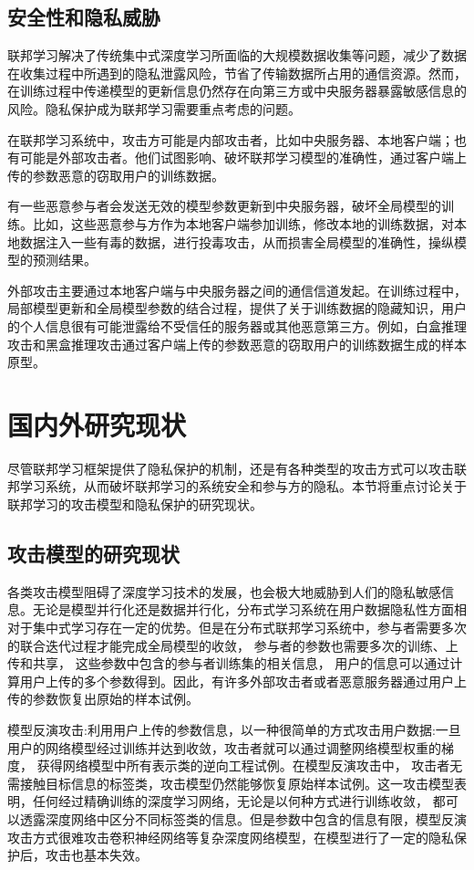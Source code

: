 \subsection{安全性和隐私威胁}
联邦学习解决了传统集中式深度学习所面临的大规模数据收集等问题，减少了数据在收集过程中所遇到的隐私泄露风险，节省了传输数据所占用的通信资源。然而，在训练过程中传递模型的更新信息仍然存在向第三方或中央服务器暴露敏感信息的风险。隐私保护成为联邦学习需要重点考虑的问题。

在联邦学习系统中，攻击方可能是内部攻击者，比如中央服务器、本地客户端；也有可能是外部攻击者。他们试图影响、破坏联邦学习模型的准确性，通过客户端上传的参数恶意的窃取用户的训练数据。

有一些恶意参与者会发送无效的模型参数更新到中央服务器，破坏全局模型的训练。比如，这些恶意参与方作为本地客户端参加训练，修改本地的训练数据，对本地数据注入一些有毒的数据，进行投毒攻击，从而损害全局模型的准确性，操纵模型的预测结果。

外部攻击主要通过本地客户端与中央服务器之间的通信信道发起。在训练过程中，局部模型更新和全局模型参数的结合过程，提供了关于训练数据的隐藏知识，用户的个人信息很有可能泄露给不受信任的服务器或其他恶意第三方。例如，白盒推理攻击和黑盒推理攻击通过客户端上传的参数恶意的窃取用户的训练数据生成的样本原型。

\section{国内外研究现状}
尽管联邦学习框架提供了隐私保护的机制，还是有各种类型的攻击方式可以攻击联邦学习系统，从而破坏联邦学习的系统安全和参与方的隐私。本节将重点讨论关于联邦学习的攻击模型和隐私保护的研究现状。

\subsection{攻击模型的研究现状}
各类攻击模型阻碍了深度学习技术的发展，也会极大地威胁到人们的隐私敏感信息。无论是模型并行化还是数据并行化，分布式学习系统在用户数据隐私性方面相对于集中式学习存在一定的优势。但是在分布式联邦学习系统中，参与者需要多次的联合迭代过程才能完成全局模型的收敛， 参与者的参数也需要多次的训练、上传和共享， 这些参数中包含的参与者训练集的相关信息， 用户的信息可以通过计算用户上传的多个参数得到。因此，有许多外部攻击者或者恶意服务器通过用户上传的参数恢复出原始的样本试例。

模型反演攻击:利用用户上传的参数信息，以一种很简单的方式攻击用户数据:一旦用户的网络模型经过训练并达到收敛，攻击者就可以通过调整网络模型权重的梯度， 获得网络模型中所有表示类的逆向工程试例。在模型反演攻击中， 攻击者无需接触目标信息的标签类，攻击模型仍然能够恢复原始样本试例。这一攻击模型表明，任何经过精确训练的深度学习网络，无论是以何种方式进行训练收敛， 都可以透露深度网络中区分不同标签类的信息。但是参数中包含的信息有限，模型反演攻击方式很难攻击卷积神经网络等复杂深度网络模型，在模型进行了一定的隐私保护后，攻击也基本失效。

